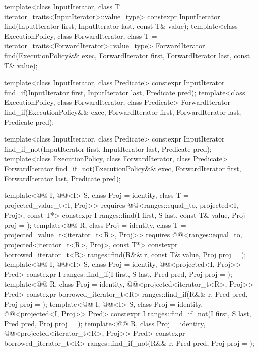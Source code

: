 %
%
%
\begin{itemdecl}
template<class InputIterator, class T = iterator_traits<InputIterator>::value_type>
  constexpr InputIterator find(InputIterator first, InputIterator last,
                               const T& value);
template<class ExecutionPolicy, class ForwardIterator,
         class T = iterator_traits<ForwardIterator>::value_type>
  ForwardIterator find(ExecutionPolicy&& exec, ForwardIterator first, ForwardIterator last,
                       const T& value);

template<class InputIterator, class Predicate>
  constexpr InputIterator find_if(InputIterator first, InputIterator last,
                                  Predicate pred);
template<class ExecutionPolicy, class ForwardIterator, class Predicate>
  ForwardIterator find_if(ExecutionPolicy&& exec, ForwardIterator first, ForwardIterator last,
                          Predicate pred);

template<class InputIterator, class Predicate>
  constexpr InputIterator find_if_not(InputIterator first, InputIterator last,
                                      Predicate pred);
template<class ExecutionPolicy, class ForwardIterator, class Predicate>
  ForwardIterator find_if_not(ExecutionPolicy&& exec,
                              ForwardIterator first, ForwardIterator last,
                              Predicate pred);

template<@@ I, @@<I> S, class Proj = identity,
         class T = projected_value_t<I, Proj>>
  requires @@<ranges::equal_to, projected<I, Proj>, const T*>
  constexpr I ranges::find(I first, S last, const T& value, Proj proj = {});
template<@@ R, class Proj = identity, class T = projected_value_t<iterator_t<R>, Proj>>
  requires @@<ranges::equal_to, projected<iterator_t<R>, Proj>, const T*>
  constexpr borrowed_iterator_t<R>
    ranges::find(R&& r, const T& value, Proj proj = {});
template<@@ I, @@<I> S, class Proj = identity,
         @@<projected<I, Proj>> Pred>
  constexpr I ranges::find_if(I first, S last, Pred pred, Proj proj = {});
template<@@ R, class Proj = identity,
         @@<projected<iterator_t<R>, Proj>> Pred>
  constexpr borrowed_iterator_t<R>
    ranges::find_if(R&& r, Pred pred, Proj proj = {});
template<@@ I, @@<I> S, class Proj = identity,
         @@<projected<I, Proj>> Pred>
  constexpr I ranges::find_if_not(I first, S last, Pred pred, Proj proj = {});
template<@@ R, class Proj = identity,
         @@<projected<iterator_t<R>, Proj>> Pred>
  constexpr borrowed_iterator_t<R>
    ranges::find_if_not(R&& r, Pred pred, Proj proj = {});
\end{itemdecl}

